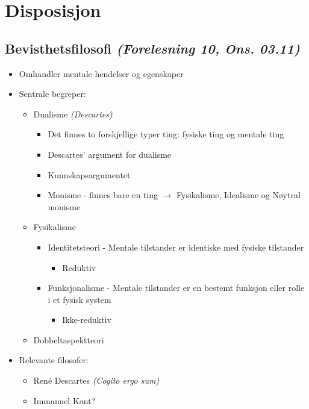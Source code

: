 \section*{Disposisjon}
\subsection*{Bevisthetsfilosofi \textnormal{\textit{(Forelesning 10, Ons. 03.11)}}}
\begin{itemize}
    \item Omhandler mentale hendelser og egenskaper
    \item Sentrale begreper:
          \begin{itemize}
              \item Dualisme \textit{(Descartes)}
                    \begin{itemize}
                        \item Det finnes to forskjellige typer ting: fysiske ting og mentale ting
                        \item Descartes' argument for dualisme
                        \item Kunnskapsargumentet
                        \item Monisme - finnes bare en ting \(\rightarrow\) Fysikalisme, Idealisme og Nøytral monisme
                    \end{itemize}
              \item Fysikalisme
                    \begin{itemize}
                        \item Identitetsteori - Mentale tilstander er identiske med fysiske tilstander
                              \begin{itemize}
                                  \item Reduktiv
                              \end{itemize}
                        \item Funksjonalisme - Mentale tilstander er en bestemt funksjon eller rolle i et fysisk system
                              \begin{itemize}
                                  \item Ikke-reduktiv
                              \end{itemize}
                    \end{itemize}
              \item Dobbeltaspektteori
          \end{itemize}
    \item Relevante filosofer:
          \begin{itemize}
              \item René Descartes \textit{(Cogito ergo sum)}
              \item Immanuel Kant?
          \end{itemize}
\end{itemize}
